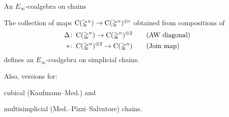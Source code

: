 \begin{frame}{An $E_\infty$-coalgebra on chains}
	\begin{theorem}[Med.]
		The collection of maps $\operatorname{C}(\mathbb{\Delta}^n) \to \operatorname{C}(\mathbb{\Delta}^n)^{\otimes r}$ obtained from compositions of
		\begin{align*}
			\Delta &\colon \operatorname{C}(\mathbb{\Delta}^n) \to \operatorname{C}(\mathbb{\Delta}^n)^{\otimes 2}
			\qquad \text{(AW diagonal)} \\
			\ast &\colon \operatorname{C}(\mathbb{\Delta}^n)^{\otimes 2} \to \operatorname{C}(\mathbb{\Delta}^n)
			\qquad \text{(Join map)}
		\end{align*}
		defines an $E_\infty$-coalgebra on simplicial chains.
	\end{theorem}

	\pause

	\qquad \qquad \scalebox{0.7}{}

	\medskip\pause

	Also, versions for: \par
		\qquad \textcolor{pblue}{cubical} (Kaufmann--Med.) and \par
		\qquad \textcolor{pblue}{multisimplicial} (Med.--Pizzi--Salvatore) chains.

\end{frame}

